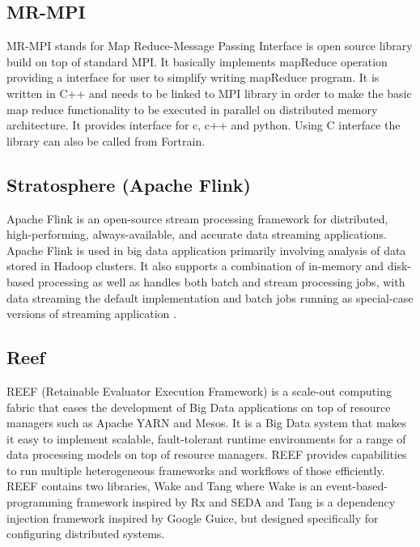 \subsection{MR-MPI}

     \cite{www-mapreducempi} MR-MPI stands for Map Reduce-Message
     Passing Interface is open source library build on top of standard
     MPI. It basically implements mapReduce operation providing a
     interface for user to simplify writing mapReduce program.  It is
     written in C++ and needs to be linked to MPI library in order to
     make the basic map reduce functionality to be executed in
     parallel on distributed memory architecture.  It provides
     interface for c, c++ and python. Using C interface the library
     can also be called from Fortrain.

\subsection{Stratosphere (Apache Flink)}
     
     Apache Flink is an open-source stream processing framework for
     distributed, high-performing, always-available, and accurate data
     streaming applications. Apache Flink is used in big data application
     primarily involving analysis of data stored in Hadoop clusters. 
     It also supports a combination of in-memory and disk-based processing
     as well as handles both batch and stream processing jobs, with data
     streaming the default implementation and batch jobs running as 
     special-case versions of streaming application \cite{www-flink}.


\subsection{Reef}

     REEF (Retainable Evaluator Execution Framework) \cite{www-reef}
     is a scale-out computing fabric that eases the development of Big
     Data applications on top of resource managers such as Apache YARN
     and Mesos. It is a Big Data system that makes it easy to
     implement scalable, fault-tolerant runtime environments for a
     range of data processing models on top of resource managers. REEF
     provides capabilities to run multiple heterogeneous frameworks
     and workflows of those efficiently. REEF contains two libraries,
     Wake and Tang where Wake is an event-based-programming framework
     inspired by Rx and SEDA and Tang is a dependency injection
     framework inspired by Google Guice, but designed specifically for
     configuring distributed systems.

